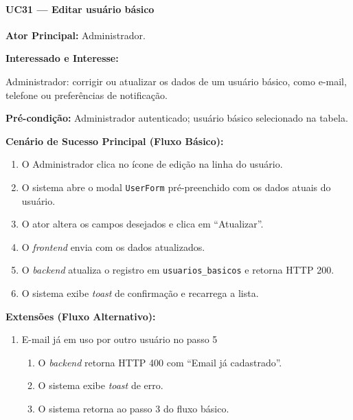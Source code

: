 \paragraph{UC31 --- Editar usuário básico}\hfill\break

\textbf{Ator Principal:} Administrador.

\textbf{Interessado e Interesse:}

Administrador: corrigir ou atualizar os dados de um usuário
básico, como e-mail, telefone ou preferências de notificação.

\textbf{Pré-condição:} Administrador autenticado; usuário
básico selecionado na tabela.

\textbf{Cenário de Sucesso Principal (Fluxo Básico):}
\begin{enumerate}
  \item O Administrador clica no ícone de edição na
        linha do usuário.
  \item O sistema abre o modal \texttt{UserForm}
        pré-preenchido com os dados atuais do usuário.
  \item O ator altera os campos desejados e clica em
        ``Atualizar''.
  \item O \textit{frontend} envia
         com
        os dados atualizados.
  \item O \textit{backend} atualiza o registro em
        \texttt{usuarios\_basicos} e retorna HTTP 200.
  \item O sistema exibe \textit{toast} de confirmação
        e recarrega a lista.
\end{enumerate}

\textbf{Extensões (Fluxo Alternativo):}

\begin{enumerate}
  \renewcommand{\theenumi}{5a}
  \renewcommand{\labelenumi}{\theenumi.}
  \item E-mail já em uso por outro usuário no passo 5
  \begin{enumerate}
  \item O \textit{backend} retorna HTTP 400 com
        ``Email já cadastrado''.
  \item O sistema exibe \textit{toast} de erro.
  \item O sistema retorna ao passo 3 do fluxo básico.
  \end{enumerate}
\end{enumerate}

